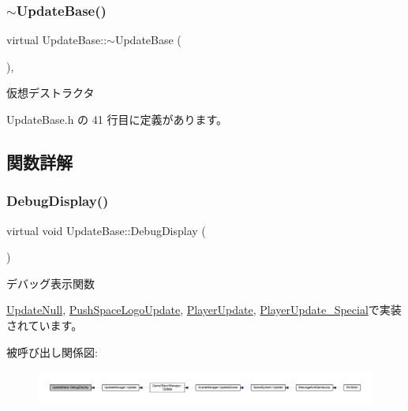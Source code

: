 \subsubsection{\texorpdfstring{$\sim$\+Update\+Base()}{~UpdateBase()}}
{\footnotesize\ttfamily virtual Update\+Base\+::$\sim$\+Update\+Base (\begin{DoxyParamCaption}{ }\end{DoxyParamCaption})\hspace{0.3cm}{\ttfamily [inline]}, {\ttfamily [virtual]}}



仮想デストラクタ 



 Update\+Base.\+h の 41 行目に定義があります。



\subsection{関数詳解}
\mbox{\label{class_update_base_a5c63c3c3ef1b85f3701718ec3f7b39e2}} 
\subsubsection{\texorpdfstring{Debug\+Display()}{DebugDisplay()}}
{\footnotesize\ttfamily virtual void Update\+Base\+::\+Debug\+Display (\begin{DoxyParamCaption}{ }\end{DoxyParamCaption})\hspace{0.3cm}{\ttfamily [pure virtual]}}



デバッグ表示関数 



\mbox{\hyperlink{class_update_null_a77aee1e614cf6dafe4f9af58b2205e4b}{Update\+Null}}, \mbox{\hyperlink{class_push_space_logo_update_ab18a0c905455da17f9e2f1fe5f0c34e6}{Push\+Space\+Logo\+Update}}, \mbox{\hyperlink{class_player_update_ac15fd0faf356c6e66f6c62c2b6b8d3ac}{Player\+Update}}, \mbox{\hyperlink{class_player_update___special_a6253000b53b2c5bc73ce0ed4d3b4a82a}{Player\+Update\+\_\+\+Special}}で実装されています。

被呼び出し関係図\+:
\nopagebreak
\begin{figure}[H]
\begin{center}
\leavevmode
\includegraphics[width=350pt]{class_update_base_a5c63c3c3ef1b85f3701718ec3f7b39e2_icgraph}
\end{center}
\end{figure}
\mbox{\label{class_update_base_afc4956f78135aed5fc4e4f9991be50b9}} 
